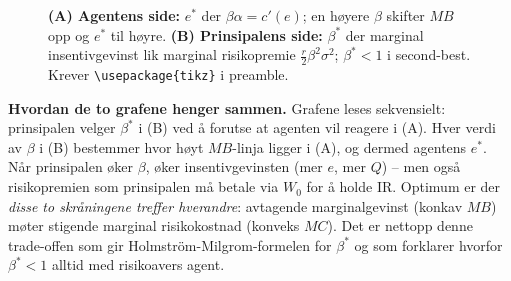 \begin{figure}[H]
\centering
{}\quad
{}
\caption{\textbf{(A) Agentens side:} $e^{*}$ der $\beta\alpha=c'(e)$; en høyere $\beta$ skifter $MB$ opp og $e^{*}$ til høyre. \textbf{(B) Prinsipalens side:} $\beta^{*}$ der marginal insentivgevinst lik marginal risikopremie $\tfrac{r}{2}\beta^{2}\sigma^{2}$; $\beta^{*}<1$ i second-best. Krever \texttt{\textbackslash usepackage\{tikz\}} i preamble.}
\end{figure}

\textbf{Hvordan de to grafene henger sammen.} Grafene leses sekvensielt: prinsipalen velger $\beta^{*}$ i (B) ved å forutse at agenten vil reagere i (A). Hver verdi av $\beta$ i (B) bestemmer hvor høyt $MB$-linja ligger i (A), og dermed agentens $e^{*}$. Når prinsipalen øker $\beta$, øker insentivgevinsten (mer $e$, mer $Q$) -- men også risikopremien som prinsipalen må betale via $W_0$ for å holde IR. Optimum er der \emph{disse to skråningene treffer hverandre}: avtagende marginalgevinst (konkav $MB$) møter stigende marginal risikokostnad (konveks $MC$). Det er nettopp denne trade-offen som gir Holmström-Milgrom-formelen for $\beta^{*}$ og som forklarer hvorfor $\beta^{*}<1$ alltid med risikoavers agent.

